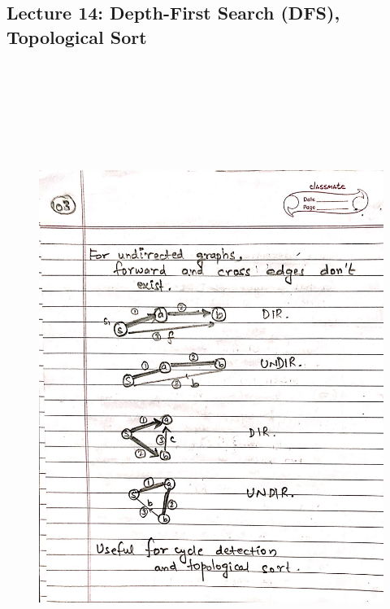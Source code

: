 \newpage
{\color{black} \subsection*{Lecture 14: Depth-First Search (DFS), Topological Sort}}
\begin{figure}[H]
    \centering
    \includegraphics[width=16cm, height=21cm]{"./MIT-6.006/MIT-6006-103"}
\end{figure}

